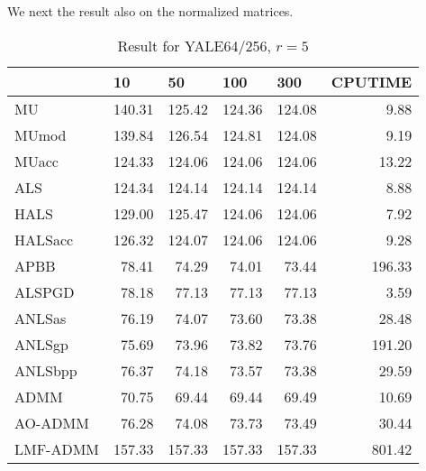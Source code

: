\documentclass{article}
\begin{document}
We next the result also on the normalized matrices.
\begin{table}[H]
		\caption{Result for YALE64/256, $r = 5$}
	\centering
	\begin{tabular}{|l|r|r|r|r|r|}
		\hline
		& \multicolumn{1}{l|}{10} & \multicolumn{1}{l|}{50} & \multicolumn{1}{l|}{100} & \multicolumn{1}{l|}{300} & \multicolumn{1}{l|}{CPUTIME} \\ \hline
		MU       & 140.31                  & 125.42                  & 124.36                   & 124.08                   & 9.88                         \\ \hline
		MUmod    & 139.84                  & 126.54                  & 124.81                   & 124.08                   & 9.19                         \\ \hline
		MUacc    & 124.33                  & 124.06                  & 124.06                   & 124.06                   & 13.22                        \\ \hline
		ALS      & 124.34                  & 124.14                  & 124.14                   & 124.14                   & 8.88                         \\ \hline
		HALS     & 129.00                  & 125.47                  & 124.06                   & 124.06                   & 7.92                         \\ \hline
		HALSacc  & 126.32                  & 124.07                  & 124.06                   & 124.06                   & 9.28                         \\ \hline
		APBB     & 78.41                   & 74.29                   & 74.01                    & 73.44                    & 196.33                       \\ \hline
		ALSPGD   & 78.18                   & 77.13                   & 77.13                    & 77.13                    & 3.59                         \\ \hline
		ANLSas   & 76.19                   & 74.07                   & 73.60                    & 73.38                    & 28.48                        \\ \hline
		ANLSgp   & 75.69                   & 73.96                   & 73.82                    & 73.76                    & 191.20                       \\ \hline
		ANLSbpp  & 76.37                   & 74.18                   & 73.57                    & 73.38                    & 29.59                        \\ \hline
		ADMM     & 70.75                   & 69.44                   & 69.44                    & 69.49                    & 10.69                        \\ \hline
		AO-ADMM  & 76.28                   & 74.08                   & 73.73                    & 73.49                    & 30.44                        \\ \hline
		LMF-ADMM & 157.33                  & 157.33                  & 157.33                   & 157.33                   & 801.42                       \\ \hline
	\end{tabular}
\end{table}
\end{document}
